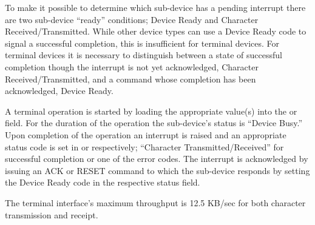 To make it possible to determine which sub-device has a pending interrupt there are two sub-device “ready” conditions; Device Ready and Character Received/Transmitted. 
While other device types can use a Device Ready code to signal a successful completion, this is insufficient for terminal devices. 
For terminal devices it is necessary to distinguish between a state of successful completion though the interrupt is not yet acknowledged, Character Received/Transmitted, and a command whose completion has been acknowledged, Device Ready.

A terminal operation is started by loading the appropriate value(s) into the \linebreak {} or  field. 
For the duration of the operation the sub-device’s status is “Device Busy.” 
Upon completion of the operation an interrupt is raised and an appropriate status code is set in  or  respectively; “Character Transmitted/Received” for successful completion or one of the error codes. 
The interrupt is acknowledged by issuing an ACK or RESET command to which the sub-device responds by setting the Device Ready code in the respective status field.

The terminal interface’s maximum throughput is 12.5 KB/sec for both character transmission and receipt.


